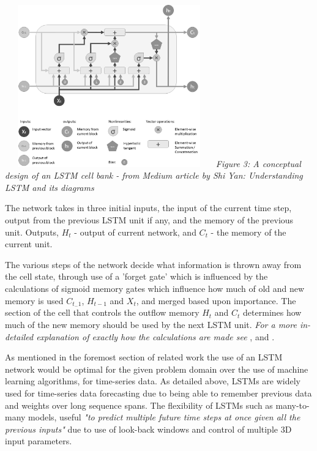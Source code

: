 \documentclass[oneside, 12pt]{article}
\begin{document}
			\begin{center}
				\includegraphics[width=9cm,height=7cm]{images/lstm.png}
				\newline
				\textit{Figure 3: A conceptual design of an LSTM cell bank - from Medium article by Shi Yan: Understanding LSTM and its diagrams}\cite{LSTMdia}
			\end{center}
			
			The network takes in three initial inputs, the input of the current time step, output from the previous LSTM unit if any, and the memory of the previous unit. Outputs, $H_t$ - output of current network, and $C_t$ - the memory of the current unit. \cite{LSTMdia}
			
			The various steps of the network decide what information is thrown away from the cell state, through use of a 'forget gate' which is influenced by the calculations of sigmoid memory gates which influence how much of old and new memory is used $C_{t_-1}$, $H_{t-1}$
			and $X_t$, and merged based upon importance. The section of the cell that controls the outflow memory $H_t$ and $C_t$ determines how much of the new memory should be used by the next LSTM unit. 
			\textit{For a more in-detailed explanation of exactly how the calculations are made see} \cite{LSTM},\cite{LSTMdia} and \cite{LSTMmaths}.
			
			As mentioned in the foremost section of related work the use of an LSTM network would be optimal for the given problem domain over the use of machine learning algorithms, for time-series data. As detailed above, LSTMs are widely used for time-series data forecasting due to being able to remember previous data and weights over long sequence spans\cite{LSTM}\cite{LSTMforetime}. The flexibility of LSTMs such as many-to-many models, useful \textit{"to predict multiple future time steps at once given all the previous inputs"} due to use of look-back windows and control of multiple 3D input parameters.\cite{LSTMforetime}
			
\end{document}
